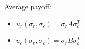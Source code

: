 \documentclass{beamer}              %
\begin{document}


\begin{frame}
    \begin{definition}
    Average payoff:
        \begin{itemize}
            \item \(u_{r}(\sigma_r, \sigma_c) = \sigma_r A \sigma_c^T\)
            \item \(u_{c}(\sigma_r, \sigma_c)  = \sigma_r B \sigma_c^T\)
        \end{itemize}
    \end{definition}
\end{frame}
\end{document}
